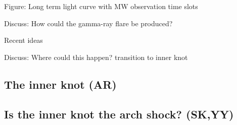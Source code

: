 Figure: Long term light curve with MW observation time slots

Discuss: How could the gamma-ray flare be produced?

Recent ideas  \cite{2016arXiv160403179Y}\cite{2015arXiv151205426Z}\cite{2016arXiv160304850N}\cite{2016arXiv160305731L}

Discuss: Where could this happen? transition to inner knot

\subsection{The inner knot   (AR)}
\subsection{Is the inner knot the arch shock?                                      (SK,YY)}
